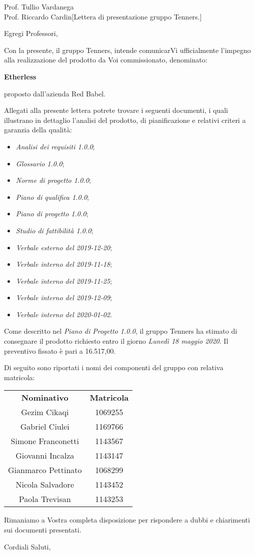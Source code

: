 \begin{letter}{Prof. Tullio Vardanega \\Prof. Riccardo Cardin}[Lettera di presentazione gruppo Tenners.]
\opening[Padova, ]{Egregi Professori,}
	Con la presente, il gruppo Tenners, intende comunicarVi ufficialmente l'impegno alla realizzazione del prodotto da Voi commissionato, denominato:
	\begin{center}
		\textbf{Etherless}
	\end{center}
    proposto dall'azienda Red Babel.
    
    Allegati alla presente lettera potrete trovare i seguenti documenti, i quali illustrano in dettaglio l'analisi del prodotto, di pianificazione e relativi criteri a garanzia della qualità:
    \begin{itemize}
    	\item \textit{Analisi dei requisiti 1.0.0};
    	\item \textit{Glossario 1.0.0};
    	\item \textit{Norme di progetto 1.0.0};
    	\item \textit{Piano di qualifica 1.0.0};
    	\item \textit{Piano di progetto 1.0.0};
    	\item \textit{Studio di fattibilità 1.0.0};
    	\item \textit{Verbale esterno del 2019-12-20};
    	\item \textit{Verbale interno del 2019-11-18};
    	\item \textit{Verbale interno del 2019-11-25};
    	\item \textit{Verbale interno del 2019-12-09};
    	\item \textit{Verbale interno del 2020-01-02}.
    \end{itemize}
    Come descritto nel \textit{Piano di Progetto 1.0.0}\docs, il gruppo Tenners ha stimato di consegnare il prodotto richiesto entro il giorno \textit{Lunedì 18 maggio 2020}. Il preventivo fissato è pari a 16.517,00\officialeuro.
    
    Di seguito sono riportati i nomi dei componenti del gruppo con relativa matricola:
    \begin{center}
        \begin{tabular}{c c}
        	\rowcolor{header}
    	    \textbf{Nominativo} & \textbf{Matricola} \\
    		Gezim Cikaqi & 1069255 \\
    		Gabriel Ciulei & 1169766\\
    		Simone Franconetti & 1143567\\
    		Giovanni Incalza & 1143147 \\
    		Gianmarco Pettinato & 1068299 \\
    		Nicola Salvadore & 1143452 \\
    		Paola Trevisan & 1143253\\
        \end{tabular}
     \end{center}
    Rimaniamo a Vostra completa disposizione per rispondere a dubbi e chiarimenti sui documenti presentati.
    
    \closing{Cordiali Saluti,}
\end{letter}